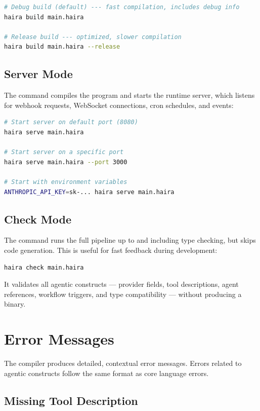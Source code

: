 \begin{lstlisting}[language=bash,numbers=none]
# Debug build (default) --- fast compilation, includes debug info
haira build main.haira

# Release build --- optimized, slower compilation
haira build main.haira --release
\end{lstlisting}

\subsection{Server Mode}

The  command compiles the program and starts the runtime server, which listens for webhook requests, WebSocket connections, cron schedules, and events:

\begin{lstlisting}[language=bash,numbers=none]
# Start server on default port (8080)
haira serve main.haira

# Start server on a specific port
haira serve main.haira --port 3000

# Start with environment variables
ANTHROPIC_API_KEY=sk-... haira serve main.haira
\end{lstlisting}

\subsection{Check Mode}

The  command runs the full pipeline up to and including type checking, but skips code generation. This is useful for fast feedback during development:

\begin{lstlisting}[language=bash,numbers=none]
haira check main.haira
\end{lstlisting}

It validates all agentic constructs --- provider fields, tool descriptions, agent references, workflow triggers, and type compatibility --- without producing a binary.

\section{Error Messages}

The compiler produces detailed, contextual error messages. Errors related to agentic constructs follow the same format as core language errors.

\subsection{Missing Tool Description}

